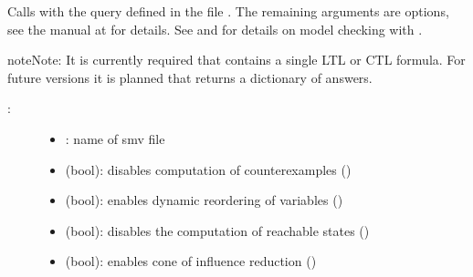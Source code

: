 \documentclass[letterpaper,10pt,english]{sphinxmanual}
\begin{document}
\begin{fulllineitems}
\label{\detokenize{ModelChecking:PyBoolNet.ModelChecking.check_smv}}
Calls {\hyperref[\detokenize{Installation:installation-nusmv}]{}} with the query defined in the  file .
The remaining arguments are {\hyperref[\detokenize{Installation:installation-nusmv}]{}} options, see the manual at  for details.
See {\hyperref[\detokenize{ModelChecking:primes2smv}]{}} and {\hyperref[\detokenize{Manual:sec-model-checking}]{}} for details on model checking with .

\begin{sphinxadmonition}{note}{Note:}
It is currently required that  contains a single LTL or CTL formula.
For future versions it is planned that {\hyperref[\detokenize{ModelChecking:check-smv}]{}} returns a dictionary of answers.
\end{sphinxadmonition}
\begin{description}
\item[{:}] \leavevmode\begin{itemize}
\item {} 
: name of smv file

\item {} 
 (bool): disables computation of counterexamples ()

\item {} 
 (bool): enables dynamic reordering of variables ()

\item {} 
 (bool): disables the computation of reachable states ()

\item {} 
 (bool): enables cone of influence reduction ()


\end{itemize}
\end{description}
\end{fulllineitems}
\end{document}
